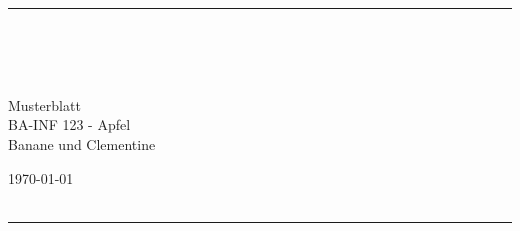 \fancyhead[C]{}
\hrule \medskip
\begin{minipage}{0.295\textwidth}
	\raggedright
	\nameA \hfill \\
	\nameB \hfill \\
	\nameC \hfill \\
\end{minipage}
\begin{minipage}{0.4\textwidth}
	\centering
	\large
	{Musterblatt\\
		\normalsize
		BA-INF 123 - Apfel}\\ Banane und Clementine\\         %
\end{minipage}
\begin{minipage}{0.295\textwidth}
	\raggedleft
	\today\hfill\\
	\yourgroup\hfill\\
\end{minipage}
\medskip\hrule
\bigskip
